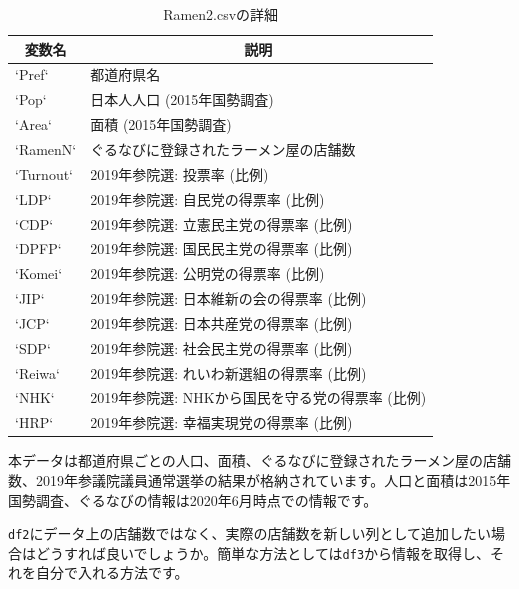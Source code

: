 \documentclass[
  a4paper,
  pandoc,
  ja=standard,
  jafont=haranoaji]{bxjsbook}
\newenvironment{Shaded}{\begin{snugshade}}{\end{snugshade}}
\newcommand{\CommentTok}[1]{\textcolor[rgb]{0.37,0.37,0.37}{#1}}
\newcommand{\FunctionTok}[1]{\textcolor[rgb]{0.28,0.35,0.67}{#1}}
\newcommand{\NormalTok}[1]{\textcolor[rgb]{0.00,0.48,0.65}{#1}}
\newcommand{\SpecialCharTok}[1]{\textcolor[rgb]{0.37,0.37,0.37}{#1}}
\begin{document}
\hypertarget{tbl-handling2_dataset}{}
\begin{table}
\caption{\label{tbl-handling2_dataset}Ramen2.csvの詳細 }

\centering
\begin{tabular}{l|l}
\hline
\multicolumn{1}{c}{変数名} & \multicolumn{1}{c}{説明}\\
\hline
`Pref` & 都道府県名\\
\hline
`Pop` & 日本人人口 (2015年国勢調査)\\
\hline
`Area` & 面積 (2015年国勢調査)\\
\hline
`RamenN` & ぐるなびに登録されたラーメン屋の店舗数\\
\hline
`Turnout` & 2019年参院選: 投票率 (比例)\\
\hline
`LDP` & 2019年参院選: 自民党の得票率 (比例)\\
\hline
`CDP` & 2019年参院選: 立憲民主党の得票率 (比例)\\
\hline
`DPFP` & 2019年参院選: 国民民主党の得票率 (比例)\\
\hline
`Komei` & 2019年参院選: 公明党の得票率 (比例)\\
\hline
`JIP` & 2019年参院選: 日本維新の会の得票率 (比例)\\
\hline
`JCP` & 2019年参院選: 日本共産党の得票率 (比例)\\
\hline
`SDP` & 2019年参院選: 社会民主党の得票率 (比例)\\
\hline
`Reiwa` & 2019年参院選: れいわ新選組の得票率 (比例)\\
\hline
`NHK` & 2019年参院選: NHKから国民を守る党の得票率 (比例)\\
\hline
`HRP` & 2019年参院選: 幸福実現党の得票率 (比例)\\
\hline
\end{tabular}
\end{table}

本データは都道府県ごとの人口、面積、ぐるなびに登録されたラーメン屋の店舗数、2019年参議院議員通常選挙の結果が格納されています。人口と面積は2015年国勢調査、ぐるなびの情報は2020年6月時点での情報です。

\texttt{df2}にデータ上の店舗数ではなく、実際の店舗数を新しい列として追加したい場合はどうすれば良いでしょうか。簡単な方法としては\texttt{df3}から情報を取得し、それを自分で入れる方法です。

\begin{Shaded}
\end{Shaded}
\end{document}

